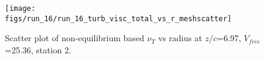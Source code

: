 \begin{figure}[H]
\centering
\texttt{[image: figs/run\_16/run\_16\_turb\_visc\_total\_vs\_r\_meshscatter]}
\caption{Scatter plot of non-equilibrium based $\nu_T$ vs radius at $z/c$=6.97, $V_{free}$=25.36, station 2.}
\label{fig:run_16_turb_visc_total_vs_r_meshscatter}
\end{figure}


